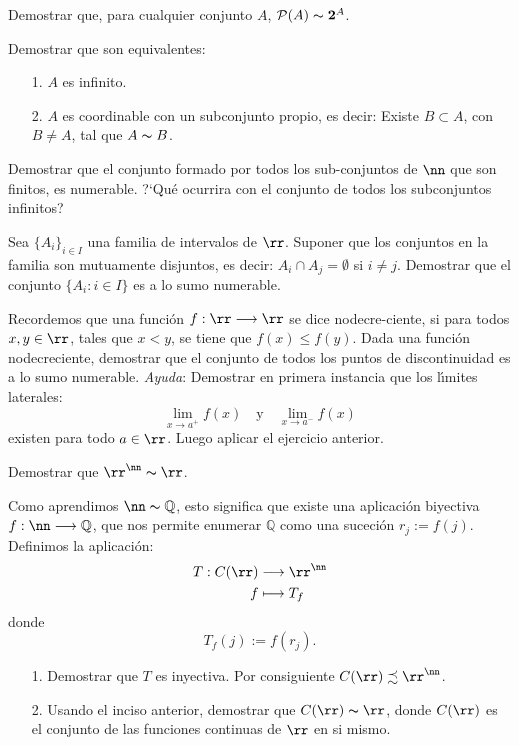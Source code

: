 \begin{ejercicio}\label{8} Demostrar que, para cualquier conjunto
$A$, $\mathcal{P}(A)\thicksim\mathbf{2}^A$.
\end{ejercicio}
\begin{ejercicio}\label{infcoordconsub} Demostrar que son
equivalentes:
\begin{itemize}
     \item[1.] $A$ es infinito.
     \item[2.] $A$ es coordinable con un subconjunto propio, es
     decir: Existe $B\subset A$, con $B\neq A$, tal que
     $A\thicksim B$.
\end{itemize}
\end{ejercicio}
\begin{ejercicio} Demostrar que el conjunto formado por todos los
sub-\newline conjuntos de $\nn$ que son finitos, es numerable.
?`Qu\'e ocurrira con el conjunto de todos los subconjuntos
infinitos?
\end{ejercicio}
\begin{ejercicio} Sea $\{A_i\}_{i\in I}$ una familia de intervalos
de $\rr$. Suponer que los conjuntos en la familia son mutuamente
disjuntos, es decir: $A_i\cap A_j=\emptyset$ si $i\neq j$.
Demostrar que el conjunto $\{A_i:i\in I\}$ es a lo sumo numerable.
\end{ejercicio}
\begin{ejercicio} Recordemos que una funci\'on
$f:\rr\longrightarrow\rr$ se dice nodecre-\newline ciente, si para
todos $x,y\in\rr$, tales que $x<y$, se tiene que $f(x)\leq f(y)$.
Dada una funci\'on nodecreciente, demostrar que el conjunto de
todos los puntos de discontinuidad es a lo sumo numerable.
\textit{Ayuda}: Demostrar en primera instancia que los
l\'{\i}mites laterales:
\[
    \lim\limits_{x\rightarrow a^+}f(x)\quad\text{y}\quad \lim\limits_{x\rightarrow
    a^-}f(x)
\]
existen para todo $a\in\rr$. Luego aplicar el ejercicio anterior.
\end{ejercicio}
\begin{ejercicio} Demostrar que $\rr^{\nn}\thicksim\rr$.
\end{ejercicio}
\begin{ejercicio} Como aprendimos $\nn\thicksim\mathbb{Q}$, esto
significa que existe una aplicaci\'on biyectiva
$f:\nn\longrightarrow\mathbb{Q}$, que nos permite enumerar
$\mathbb{Q}$ como una suceci\'on $r_j:=f(j)$. Definimos la
aplicaci\'on:
\[\begin{split}
              T:C(\rr)&\longrightarrow \rr^{\nn}\\
              f        &\longmapsto T_f\\
\end{split}\]
donde
\[
  T_f(j):=f(r_j).
\]
\begin{itemize}
   \item [1.] Demostrar que $T$ es inyectiva. Por consiguiente
   $C(\rr)\precsim\rr^{\nn}$.
   \item[2.] Usando el inciso anterior, demostrar que
    $C(\rr)\thicksim\rr$, donde $C(\rr)$ es el conjunto
    de las funciones continuas de $\rr$ en si mismo.
\end{itemize}
\end{ejercicio}
